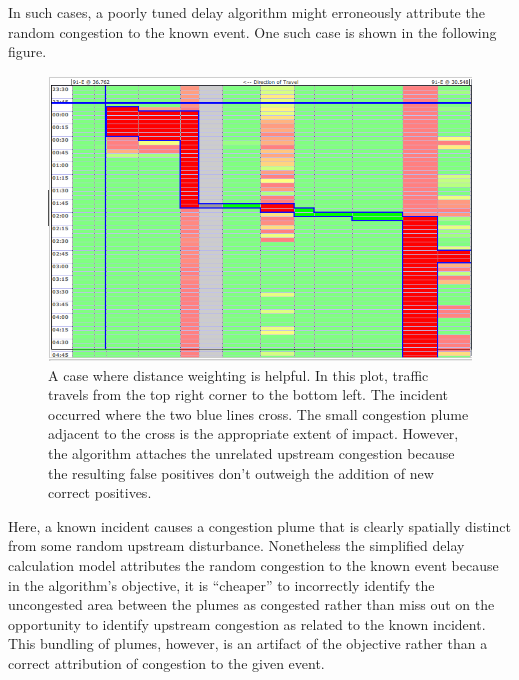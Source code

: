 \documentclass[12pt]{report}
\newcounter{time}
\newcounter{space}
\begin{document}
In such cases, a poorly tuned delay algorithm might erroneously
attribute the random congestion to the known event.  One such case is
shown in the following figure.
\begin{figure}[t]
  \begin{center}
    \includegraphics[width=\textwidth]{images/distance-weighting-helpful.png}
    \caption[A case where distance weighting is helpful]{A case where distance
      weighting is helpful.  In this plot, traffic travels from the top right
      corner to the bottom left.  The incident occurred where the two blue lines
      cross.  The small congestion plume adjacent to the cross is the
      appropriate extent of impact.  However, the algorithm attaches the
      unrelated upstream congestion because the resulting false positives don't
      outweigh the addition of new correct positives.}
    \label{fig:time-space-random-versus-known}
  \end{center}
\end{figure}
Here, a known incident causes a congestion plume that is clearly
spatially distinct from some random upstream disturbance.  Nonetheless
the simplified delay calculation model attributes the random
congestion to the known event because in the algorithm's objective, it
is ``cheaper'' to incorrectly identify the uncongested area between
the plumes as congested rather than miss out on the opportunity to
identify upstream congestion as related to the known incident.  This
bundling of plumes, however, is an artifact of the objective rather
than a correct attribution of congestion to the given event.
\end{document}
